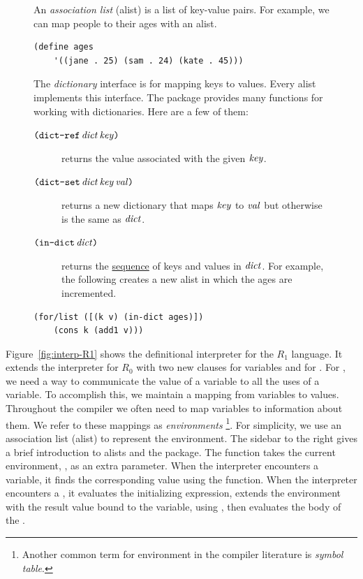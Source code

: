 \documentclass[11pt]{book}
\begin{document}
\begin{figure}
  \small
  \begin{tcolorbox}[title=Association Lists as Dictionaries]
  An \emph{association list} (alist) is a list of key-value pairs.
  For example, we can map people to their ages with an alist.
  \begin{lstlisting}[basicstyle=\ttfamily\footnotesize]
  (define ages
    '((jane . 25) (sam . 24) (kate . 45)))
  \end{lstlisting}
  The \emph{dictionary} interface is for mapping keys to values.
  Every alist implements this interface.   The package
  \href{https://docs.racket-lang.org/reference/dicts.html}{}
  provides many functions for working with dictionaries. Here
  are a few of them:
  \begin{description}
  \item[$\texttt{(}\texttt{dict-ref}\,\mathit{dict}\,\mathit{key}\texttt{)}$]
    returns the value associated with the given $\mathit{key}$.
  \item[$\texttt{(}\texttt{dict-set}\,\mathit{dict}\,\mathit{key}\,\mathit{val}\texttt{)}$]
    returns a new dictionary that maps $\mathit{key}$ to $\mathit{val}$
    but otherwise is the same as $\mathit{dict}$.
  \item[$\texttt{(}\texttt{in-dict}\,\mathit{dict}\texttt{)}$] returns the
    \href{https://docs.racket-lang.org/reference/sequences.html}{sequence}
    of keys and values in $\mathit{dict}$. For example, the following
    creates a new alist in which the ages are incremented.
  \end{description}
  \vspace{-10pt}
  \begin{lstlisting}[basicstyle=\ttfamily\footnotesize]
  (for/list ([(k v) (in-dict ages)])
    (cons k (add1 v)))
  \end{lstlisting}
\end{tcolorbox}
\end{figure}

Figure~\ref{fig:interp-R1} shows the definitional interpreter for the
$R_1$ language. It extends the interpreter for $R_0$ with two new
 clauses for variables and for .  For ,
we need a way to communicate the value of a variable to all the uses
of a variable. To accomplish this, we maintain a mapping from
variables to values. Throughout the compiler we often need to map
variables to information about them. We refer to these mappings as
\emph{environments}
\footnote{Another common term for environment in the compiler
  literature is \emph{symbol table}.}.
For simplicity, we use an
association list (alist) to represent the environment. The sidebar to
the right gives a brief introduction to alists and the
 package.  The  function takes the
current environment, , as an extra parameter.  When the
interpreter encounters a variable, it finds the corresponding value
using the  function.  When the interpreter encounters a
, it evaluates the initializing expression, extends the
environment with the result value bound to the variable, using
, then evaluates the body of the .
\end{document}
